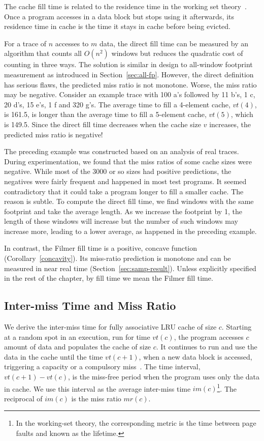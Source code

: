 The cache fill time is related to the residence time in the working
set theory~\cite{Denning:TSE80}.  Once a program accesses in a data
block but stops using it afterwards, its residence time in cache is
the time it stays in cache before being evicted.

For a trace of $n$ accesses to $m$ data, the direct fill time can be
measured by an algorithm that counts all $O(n^2)$ windows but reduces
the quadratic cost of counting in three ways.  The solution is similar
in design to all-window footprint measurement as introduced in
Section~\ref{sec:all-fp}. However, the direct definition has serious
flaws, the predicted miss ratio is not monotone.  Worse, the miss
ratio may be negative.  Consider an example trace with 100 a's
followed by 11 b's, 1 c, 20 d's, 15 e's, 1 f and 320 g's.  The average
time to fill a 4-element cache, $vt(4)$, is 161.5, is longer than the
average time to fill a 5-element cache, $vt(5)$, which is 149.5.
Since the direct fill time decreases when the cache size $v$
increases, the predicted miss ratio is negative! 

The preceding example was constructed based on an analysis of real
traces.  During experimentation, we found that the miss ratios of some
cache sizes were negative.  While most of the 3000 or so sizes
had positive predictions, the negatives were fairly frequent and happened in
most test programs.  It seemed contradictory that it could take a
program longer to fill a smaller cache.  The reason is
subtle.  To compute the direct fill time, we find windows with the same
footprint and take the average length.  As we increase the footprint
by 1, the length of these windows will increase but the number of such
windows may increase more, leading to a lower average, as happened in
the preceding example.

In contrast, the Filmer fill time is a positive, concave function
(Corollary~\ref{concavity}).  Its miss-ratio prediction is monotone and
can be measured in near real time (Section~\ref{sec:samp-result}).
Unless explicitly specified in the rest of the chapter, by
fill time we mean the Filmer fill time.

\subsection{Inter-miss Time and Miss Ratio}
\label{subsec:mr}

We derive the inter-miss time for fully associative LRU cache of size
$c$. Starting at a random spot in an execution, run for time $vt(c)$,
the program accesses $c$ amount of data and populates the cache of
size $c$.  It continues to run and use the data in the cache until the
time $vt(c+1)$, when a new data block is accessed, triggering a
capacity or a compulsory miss~\cite{Hill:Dissertation}.  The time
interval, $vt(c+1) - vt(c)$, is the miss-free period when the program
uses only the data in cache.  We use this interval as the average
inter-miss time $im(c)$\footnote{In the working-set theory, the
  corresponding metric is the time between page faults and known as
  the lifetime.}.  The reciprocal of $im(c)$ is the miss ratio
$mr(c)$.

